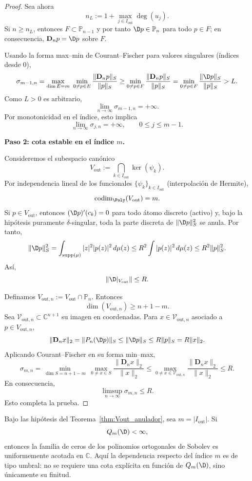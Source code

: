\begin{proof}
	Sea ahora
	\[
		n_L:=1+\max_{j\in I_{\mathrm{out}}}\deg(u_j).
	\]
	Si $n\ge n_L$, entonces $F\subset\mathbb P_{n-1}$ y por tanto
	$\D p\in\mathbb{P}_n$ para todo $p\in F$; en consecuencia,
	$\mathbf D_n p=\D p$ sobre $F$.

	Usando la forma max--min de Courant--Fischer para valores singulares (índices desde $0$),
	\[
		\sigma_{m-1,n}
		=
		\max_{\dim E=m}\ \min_{0\ne p\in E}\frac{\|\mathbf D_np\|_S}{\|p\|_S}
		\ge
		\min_{0\ne p\in F}\frac{\|\mathbf D_np\|_S}{\|p\|_S}
		=
		\min_{0\ne p\in F}\frac{\|\D p\|_S}{\|p\|_S}
		> L.
	\]
	Como $L>0$ es arbitrario,
	\[
		\lim_{n\to\infty}\sigma_{m-1,n}=+\infty.
	\]
	Por monotonicidad en el índice, esto implica
	\[
		\lim_{n\to\infty}\sigma_{j,n}=+\infty,
		\qquad 0\le j\le m-1.
	\]

	\medskip
	\noindent
	\textbf{Paso 2: cota estable en el índice $m$.}

	Consideremos el subespacio canónico
	\[
		V_{\mathrm{out}}:=\bigcap_{k\in I_{\mathrm{out}}}\ker(\psi_k).
	\]
	Por independencia lineal de los funcionales $\{\psi_k\}_{k\in I_{\mathrm{out}}}$
	(interpolación de Hermite),
	\[
		\operatorname{codim}_{\Poly}(V_{\mathrm{out}})=m.
	\]
	Si $p\in V_{\mathrm{out}}$, entonces $(\D p)'(c_k)=0$ para todo átomo discreto
	(activo) y, bajo la hipótesis puramente $\delta$-singular, toda la parte discreta de
	$\|\D p\|_S^2$ se anula. Por tanto,
	\[
		\|\D p\|_S^2
		=
		\int_{\operatorname{supp}(\mu)}|z|^2|p(z)|^2\,d\mu(z)
		\le
		R^2\int |p(z)|^2\,d\mu(z)
		\le
		R^2\|p\|_S^2.
	\]
	Así,
	\[
		\|\D|_{V_{\mathrm{out}}}\|\le R.
	\]

	Definamos $V_{\mathrm{out},n}:=V_{\mathrm{out}}\cap\mathbb{P}_n$. Entonces
	\[
		\dim(V_{\mathrm{out},n})\ge n+1-m.
	\]
	Sea $\mathcal V_{\mathrm{out},n}\subset\mathbb C^{n+1}$ su imagen en coordenadas.
	Para $x\in\mathcal V_{\mathrm{out},n}$ asociado a $p\in V_{\mathrm{out},n}$,
	\[
		\|\mathbf D_nx\|_2
		=
		\|P_n(\D p)\|_S
		\le
		\|\D p\|_S
		\le
		R\|p\|_S
		=
		R\|x\|_2.
	\]
	Aplicando Courant--Fischer en su forma min--max,
	\[
		\sigma_{m,n}
		=
		\min_{\dim S=n+1-m}\ \max_{0\ne x\in S}\frac{\|\mathbf D_nx\|_2}{\|x\|_2}
		\le
		\max_{0\ne x\in\mathcal V_{\mathrm{out},n}}\frac{\|\mathbf D_nx\|_2}{\|x\|_2}
		\le R.
	\]
	En consecuencia,
	\[
		\limsup_{n\to\infty}\sigma_{m,n}\le R.
	\]
	Esto completa la prueba.
\end{proof}

\begin{thm}\label{thm:criterio_singular_ceros_objetivo}
	Bajo las hipótesis del Teorema~\ref{thm:Vout_anulador}, sea $m=|I_{\mathrm{out}}|$. Si
	\[
		Q_m(\D)<\infty,
	\]
	entonces la familia de ceros de los polinomios ortogonales de Sobolev es uniformemente acotada en $\mathbb C$.
	Aquí la dependencia respecto del índice $m$ es de tipo umbral: no se requiere una cota explícita en función de $Q_m(\D)$, sino únicamente su finitud.
\end{thm}

